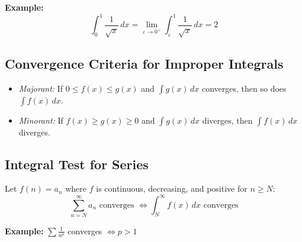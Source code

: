 \textbf{Example:}
\[
\int_0^1 \frac{1}{\sqrt{x}}\,dx = \lim_{\varepsilon \to 0^+} \int_\varepsilon^1 \frac{1}{\sqrt{x}}\,dx = 2
\]

\subsection{Convergence Criteria for Improper Integrals}

\begin{itemize}[label=\(-\)]
\item \emph{Majorant:} If \(0 \le f(x) \le g(x)\) and \(\int g(x)\,dx\) converges, then so does \(\int f(x)\,dx\).
\item \emph{Minorant:} If \(f(x) \ge g(x) \ge 0\) and \(\int g(x)\,dx\) diverges, then \(\int f(x)\,dx\) diverges.
\end{itemize}

\subsection{Integral Test for Series}

Let \(f(n) = a_n\) where \(f\) is continuous, decreasing, and positive for \(n \ge N\):
\[
\sum_{n=N}^\infty a_n \text{ converges } \iff \int_N^\infty f(x)\,dx \text{ converges}
\]

\textbf{Example:} \(\sum \frac{1}{n^p}\) converges \(\iff p > 1\)

